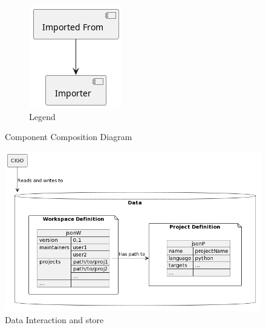 \documentclass[11pt]{article}
\begin{document}
\begin{figure}[h!]
\begin{subfigure}{0.15\linewidth}
    \includegraphics[width=\linewidth]{diags/comp_legend.png}
    \caption{\label{fig:comp}Legend}
  \end{subfigure}
  \caption{Component Composition Diagram}
\end{figure}
\newpage

\begin{figure}[h!]
\end{figure}

\begin{figure}[h!]
  \centering
  \includegraphics[width=0.8\linewidth]{diags/system.png}
  \caption{Data Interaction and store}
  \label{fig:storage}
\end{figure}
\end{document}
